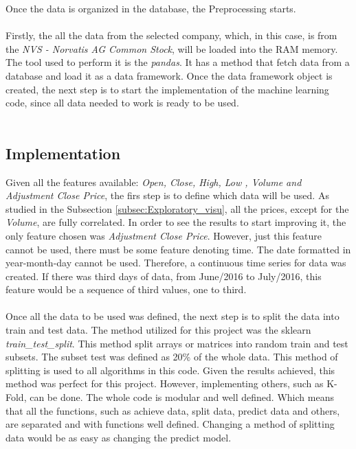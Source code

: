 Once the data is organized in the database, the Preprocessing starts.\\
\\
Firstly, the all the data from the selected company, which, in this case, is from the \textit{NVS - Norvatis AG Common Stock}, will be loaded into the RAM memory. The tool used to perform it
is the \textit{pandas}. It has a method that fetch data from a database and load it as a data framework. Once the data framework object is created, the next step is to start the implementation 
of the machine learning code, since all data needed to work is ready to be used.\\
\\


\subsection{Implementation}
\label{subsec:implementation}
Given all the features available: \textit{Open, Close, High, Low , Volume and Adjustment Close Price}, the firs step is to define which data will be used. As studied in the Subsection \ref{subsec:Exploratory_visu},
all the prices, except for the \textit{Volume}, are fully correlated. In order to see the results to start improving it, the only feature chosen was \textit{Adjustment Close Price}. However,
just this feature cannot be used, there must be some feature denoting time. The date formatted in year-month-day cannot be used. Therefore, a continuous time series for data was created. If 
there was third days of data, from June/2016 to July/2016, this feature would be a sequence of third values, one to third.\\
\\
Once all the data to be used was defined, the next step is to split the data into train and test data. The method utilized for this project was the sklearn \textit{train\_test\_split}. This method
split arrays or matrices into random train and test subsets. The subset test was defined as 20\% of the whole data. This method of splitting is used to all algorithms in this code. Given the results
achieved, this method was perfect for this project. However, implementing others, such as K-Fold, can be done. The whole code is modular and well defined. Which means that all the functions, such
as achieve data, split data, predict data and others, are separated and with functions well defined. Changing a method of splitting data would be as easy as changing the predict model.\\
\\
